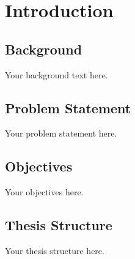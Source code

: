 \chapter{Introduction}
\section{Background}
Your background text here.
\section{Problem Statement}
Your problem statement here.
\section{Objectives}
Your objectives here.
\section{Thesis Structure}
Your thesis structure here.
